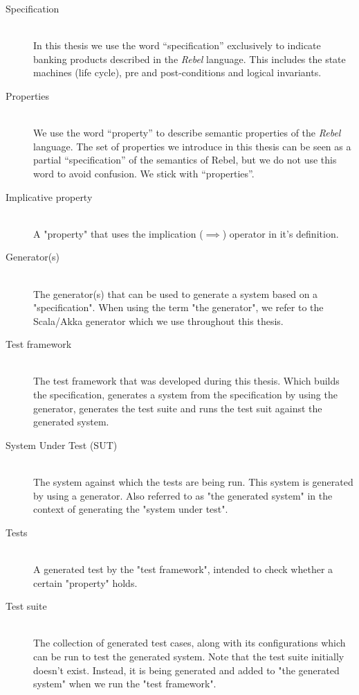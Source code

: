 \begin{description}
\item[Specification]\hfill\\
In this thesis we use the word “specification” exclusively to indicate banking products described in the \textit{Rebel} language. This includes the state machines (life cycle), pre and post-conditions and logical invariants.

\item[Properties]\hfill\\
We use the word “property” to describe semantic properties of the \textit{Rebel} language. The set of properties we introduce in this thesis can be seen as a partial “specification” of the semantics of Rebel, but we do not use this word to avoid confusion. We stick with “properties”.

\item[Implicative property]\hfill\\
A "property" that uses the implication ($\implies$) operator in it's definition.

\item[Generator(s)]\hfill\\
The generator(s) that can be used to generate a system based on a "specification". When using the term "the generator", we refer to the Scala/Akka generator which we use throughout this thesis.

\item[Test framework]\hfill\\
The test framework that was developed during this thesis. Which builds the specification, generates a system from the specification by using the generator, generates the test suite and runs the test suit against the generated system.

\item[System Under Test (SUT)]\hfill\\
The system against which the tests are being run. This system is generated by using a generator. Also referred to as "the generated system" in the context of generating the "system under test".

\item[Tests]\hfill\\
A generated test by the "test framework", intended to check whether a certain "property" holds.

\item[Test suite]\hfill\\
The collection of generated test cases, along with its configurations which can be run to test the generated system. Note that the test suite initially doesn't exist. Instead, it is being generated and added to "the generated system" when we run the "test framework".


\end{description}
